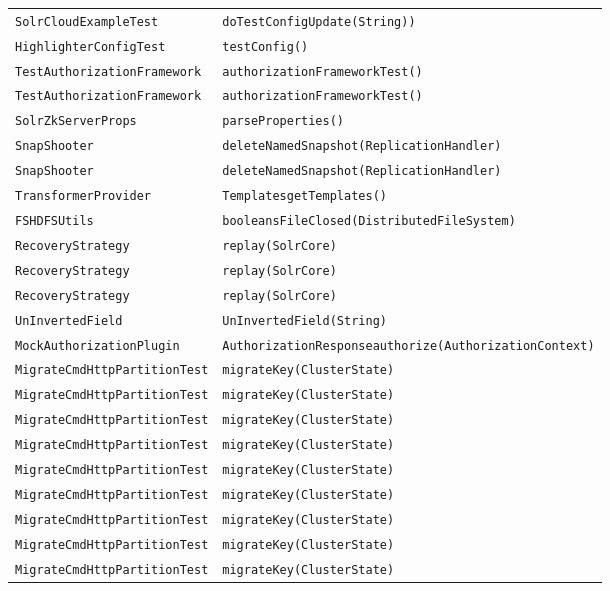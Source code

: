 \begin{center}
\begin{longtable}{ll}
\lstinline/SolrCloudExampleTest/&{\lstinline/doTestConfigUpdate(String))/}\\
\lstinline/HighlighterConfigTest/&{\lstinline/testConfig()/}\\
\lstinline/TestAuthorizationFramework/&{\lstinline/authorizationFrameworkTest()/}\\
\lstinline/TestAuthorizationFramework/&{\lstinline/authorizationFrameworkTest()/}\\
\lstinline/SolrZkServerProps/&{\lstinline/parseProperties()/}\\
\lstinline/SnapShooter/&{\lstinline/deleteNamedSnapshot(ReplicationHandler)/}\\
\lstinline/SnapShooter/&{\lstinline/deleteNamedSnapshot(ReplicationHandler)/}\\
\lstinline/TransformerProvider/&{\lstinline/TemplatesgetTemplates()/}\\
\lstinline/FSHDFSUtils/&{\lstinline/booleansFileClosed(DistributedFileSystem)/}\\
\lstinline/RecoveryStrategy/&{\lstinline/replay(SolrCore)/}\\
\lstinline/RecoveryStrategy/&{\lstinline/replay(SolrCore)/}\\
\lstinline/RecoveryStrategy/&{\lstinline/replay(SolrCore)/}\\
\lstinline/UnInvertedField/&{\lstinline/UnInvertedField(String)/}\\
\lstinline/MockAuthorizationPlugin/&{\lstinline/AuthorizationResponseauthorize(AuthorizationContext)/}\\
\lstinline/MigrateCmdHttpPartitionTest/&{\lstinline/migrateKey(ClusterState)/}\\
\lstinline/MigrateCmdHttpPartitionTest/&{\lstinline/migrateKey(ClusterState)/}\\
\lstinline/MigrateCmdHttpPartitionTest/&{\lstinline/migrateKey(ClusterState)/}\\
\lstinline/MigrateCmdHttpPartitionTest/&{\lstinline/migrateKey(ClusterState)/}\\
\lstinline/MigrateCmdHttpPartitionTest/&{\lstinline/migrateKey(ClusterState)/}\\
\lstinline/MigrateCmdHttpPartitionTest/&{\lstinline/migrateKey(ClusterState)/}\\
\lstinline/MigrateCmdHttpPartitionTest/&{\lstinline/migrateKey(ClusterState)/}\\
\lstinline/MigrateCmdHttpPartitionTest/&{\lstinline/migrateKey(ClusterState)/}\\
\lstinline/MigrateCmdHttpPartitionTest/&{\lstinline/migrateKey(ClusterState)/}\\

\end{longtable}
\end{center}
